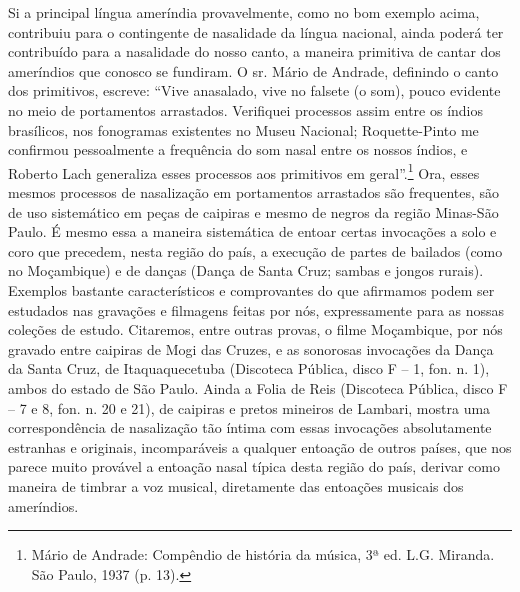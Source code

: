 Si a principal língua ameríndia provavelmente, como no bom exemplo
acima, contribuiu para o contingente de nasalidade da língua nacional,
ainda poderá ter contribuído para a nasalidade do nosso canto, a maneira
primitiva de cantar dos ameríndios que conosco se fundiram. O sr. Mário
de Andrade, definindo o canto dos primitivos, escreve: ``Vive anasalado,
vive no falsete (o som), pouco evidente no meio de portamentos
arrastados. Verifiquei processos assim entre os índios brasílicos, nos
fonogramas existentes no Museu Nacional; Roquette-Pinto me confirmou
pessoalmente a frequência do som nasal entre os nossos índios, e Roberto
Lach generaliza esses processos aos primitivos em geral''.\footnote{Mário de Andrade: Compêndio de história da música, 3ª ed. L.G.
Miranda. São Paulo, 1937 (p. 13).} Ora,
esses mesmos processos de nasalização em portamentos arrastados são
frequentes, são de uso sistemático em peças de caipiras e mesmo de
negros da região Minas-São Paulo. É mesmo essa a maneira sistemática de
entoar certas invocações a solo e coro que precedem, nesta região do
país, a execução de partes de bailados (como no Moçambique) e de danças
(Dança de Santa Cruz; sambas e jongos rurais). Exemplos bastante
característicos e comprovantes do que afirmamos podem ser estudados nas
gravações e filmagens feitas por nós, expressamente para as nossas
coleções de estudo. Citaremos, entre outras provas, o filme Moçambique,
por nós gravado entre caipiras de Mogi das Cruzes, e as sonorosas
invocações da Dança da Santa Cruz, de Itaquaquecetuba (Discoteca
Pública, disco F -- 1, fon. n. 1), ambos do estado de São Paulo. Ainda a
Folia de Reis (Discoteca Pública, disco F -- 7 e 8, fon. n. 20 e 21), de
caipiras e pretos mineiros de Lambari, mostra uma correspondência de
nasalização tão íntima com essas invocações absolutamente estranhas e
originais, incomparáveis a qualquer entoação de outros países, que nos
parece muito provável a entoação nasal típica desta região do país,
derivar como maneira de timbrar a voz musical, diretamente das entoações
musicais dos ameríndios.

